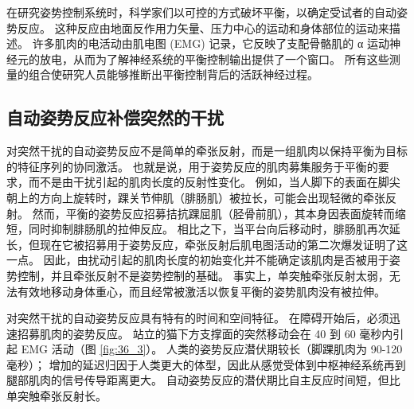 在研究姿势控制系统时，科学家们以可控的方式破坏平衡，以确定受试者的自动姿势反应。
这种反应由地面反作用力矢量、压力中心的运动和身体部位的运动来描述。
许多肌肉的电活动由肌电图 (EMG) 记录，它反映了支配骨骼肌的 α 运动神经元的放电，从而为了解神经系统的平衡控制输出提供了一个窗口。
所有这些测量的组合使研究人员能够推断出平衡控制背后的活跃神经过程。


\subsection{自动姿势反应补偿突然的干扰}

对突然干扰的自动姿势反应不是简单的牵张反射，而是一组肌肉以保持平衡为目标的特征序列的协同激活。
也就是说，用于姿势反应的肌肉募集服务于平衡的要求，而不是由干扰引起的肌肉长度的反射性变化。
例如，当人脚下的表面在脚尖朝上的方向上旋转时，踝关节伸肌（腓肠肌）被拉长，可能会出现轻微的牵张反射。
然而，平衡的姿势反应招募拮抗踝屈肌（胫骨前肌），其本身因表面旋转而缩短，同时抑制腓肠肌的拉伸反应。
相比之下，当平台向后移动时，腓肠肌再次延长，但现在它被招募用于姿势反应，牵张反射后肌电图活动的第二次爆发证明了这一点。
因此，由扰动引起的肌肉长度的初始变化并不能确定该肌肉是否被用于姿势控制，并且牵张反射不是姿势控制的基础。
事实上，单突触牵张反射太弱，无法有效地移动身体重心，而且经常被激活以恢复平衡的姿势肌肉没有被拉伸。


对突然干扰的自动姿势反应具有特有的时间和空间特征。 在障碍开始后，必须迅速招募肌肉的姿势反应。
站立的猫下方支撑面的突然移动会在 40 到 60 毫秒内引起 EMG 活动（图 \ref{fig:36_3}）。
人类的姿势反应潜伏期较长（脚踝肌肉为 90-120 毫秒）；
增加的延迟归因于人类更大的体型，因此从感觉受体到中枢神经系统再到腿部肌肉的信号传导距离更大。
自动姿势反应的潜伏期比自主反应时间短，但比单突触牵张反射长。


